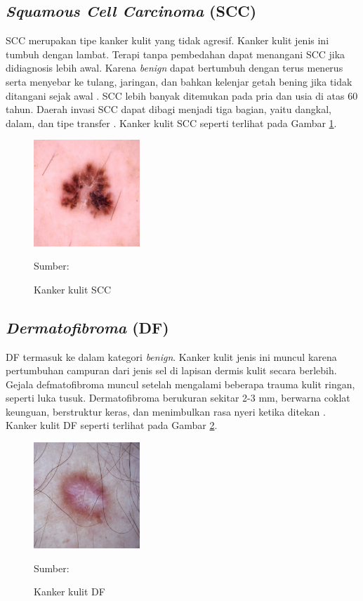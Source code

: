     \subsection{\textit{Squamous Cell Carcinoma} (SCC)}
    SCC merupakan tipe kanker kulit yang tidak agresif. Kanker kulit jenis ini tumbuh dengan lambat. Terapi tanpa pembedahan dapat menangani SCC jika didiagnosis lebih awal. Karena \textit{benign} dapat bertumbuh dengan terus menerus serta menyebar ke tulang, jaringan, dan bahkan kelenjar getah bening jika tidak ditangani sejak awal \citep{Fuadah2020a}. SCC lebih banyak ditemukan pada pria dan usia di atas 60 tahun. Daerah invasi SCC dapat dibagi menjadi tiga bagian, yaitu dangkal, dalam, dan tipe transfer \citep{Sang2019}. Kanker kulit SCC seperti terlihat pada Gambar \ref{fig:scc}.
    \begin{figure}[H] 
        \begin{center} 
            \includegraphics[width=4cm]{img/bab2/scc.jpg}
            \caption{Kanker kulit SCC} 
            \label{fig:scc}
            Sumber: \citep{Codella2018,Combalia2019,Tschandl2018}
        \end{center} 
    \end{figure}

    \subsection{\textit{Dermatofibroma} (DF)}
    DF termasuk ke dalam kategori \textit{benign}. Kanker kulit jenis ini muncul karena pertumbuhan campuran dari jenis sel di lapisan dermis kulit secara berlebih. Gejala defmatofibroma muncul setelah mengalami beberapa trauma kulit ringan, seperti luka tusuk. Dermatofibroma berukuran sekitar 2-3 mm, berwarna coklat keunguan, berstruktur keras, dan menimbulkan rasa nyeri ketika ditekan \citep{Fuadah2020a}. Kanker kulit DF seperti terlihat pada Gambar \ref{fig:df}.
    \begin{figure}[H] 
        \begin{center} 
            \includegraphics[width=4cm]{img/bab2/df.jpg}
            \caption{Kanker kulit DF} 
            \label{fig:df}
            Sumber: \citep{Codella2018,Combalia2019,Tschandl2018}
        \end{center} 
    \end{figure}

